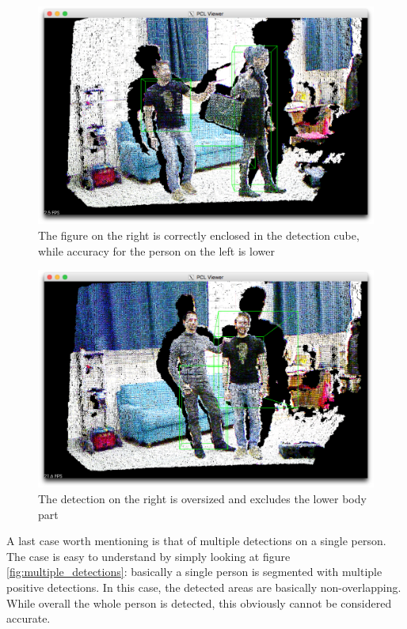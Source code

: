 \documentclass[a4paper,11pt,titlepage]{article}
\begin{document}
\begin{figure}[h]
  \centering
  \includegraphics[scale=0.2]{good_accuracy.png}
  \caption{The figure on the right is correctly enclosed in the detection cube,
  while accuracy for the person on the left is lower}
  \label{fig:good_accuracy}
\end{figure}

\begin{figure}[h]
  \centering
  \includegraphics[scale=0.2]{good_dr_but_inaccurate.png}
  \caption{The detection on the right is oversized and excludes the lower body
  part}
  \label{fig:good_dr_but_inaccurate}
\end{figure}

A last case worth mentioning is that of multiple detections on a single person.
The case is easy to understand by simply looking at figure
\ref{fig:multiple_detections}: basically a single person is segmented with
multiple positive detections. In this case, the detected areas are
basically non-overlapping. While overall the whole person is detected, this
obviously cannot be considered accurate.
\end{document}

